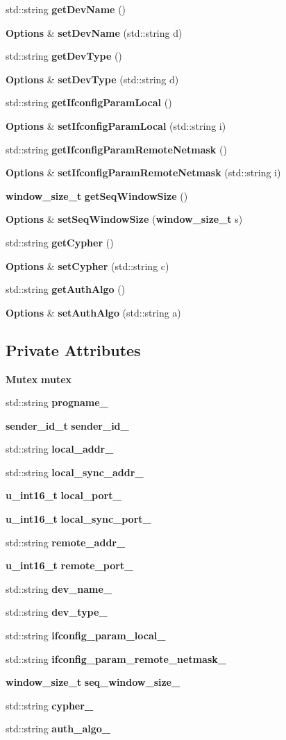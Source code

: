 \begin{CompactItemize}
\item 
std::string {\bf get\-Dev\-Name} ()
\item 
{\bf Options} \& {\bf set\-Dev\-Name} (std::string d)
\item 
std::string {\bf get\-Dev\-Type} ()
\item 
{\bf Options} \& {\bf set\-Dev\-Type} (std::string d)
\item 
std::string {\bf get\-Ifconfig\-Param\-Local} ()
\item 
{\bf Options} \& {\bf set\-Ifconfig\-Param\-Local} (std::string i)
\item 
std::string {\bf get\-Ifconfig\-Param\-Remote\-Netmask} ()
\item 
{\bf Options} \& {\bf set\-Ifconfig\-Param\-Remote\-Netmask} (std::string i)
\item 
{\bf window\_\-size\_\-t} {\bf get\-Seq\-Window\-Size} ()
\item 
{\bf Options} \& {\bf set\-Seq\-Window\-Size} ({\bf window\_\-size\_\-t} s)
\item 
std::string {\bf get\-Cypher} ()
\item 
{\bf Options} \& {\bf set\-Cypher} (std::string c)
\item 
std::string {\bf get\-Auth\-Algo} ()
\item 
{\bf Options} \& {\bf set\-Auth\-Algo} (std::string a)
\end{CompactItemize}
\subsection*{Private Attributes}
\begin{CompactItemize}
\item 
{\bf Mutex} {\bf mutex}
\item 
std::string {\bf progname\_\-}
\item 
{\bf sender\_\-id\_\-t} {\bf sender\_\-id\_\-}
\item 
std::string {\bf local\_\-addr\_\-}
\item 
std::string {\bf local\_\-sync\_\-addr\_\-}
\item 
{\bf u\_\-int16\_\-t} {\bf local\_\-port\_\-}
\item 
{\bf u\_\-int16\_\-t} {\bf local\_\-sync\_\-port\_\-}
\item 
std::string {\bf remote\_\-addr\_\-}
\item 
{\bf u\_\-int16\_\-t} {\bf remote\_\-port\_\-}
\item 
std::string {\bf dev\_\-name\_\-}
\item 
std::string {\bf dev\_\-type\_\-}
\item 
std::string {\bf ifconfig\_\-param\_\-local\_\-}
\item 
std::string {\bf ifconfig\_\-param\_\-remote\_\-netmask\_\-}
\item 
{\bf window\_\-size\_\-t} {\bf seq\_\-window\_\-size\_\-}
\item 
std::string {\bf cypher\_\-}
\item 
std::string {\bf auth\_\-algo\_\-}
\end{CompactItemize}


